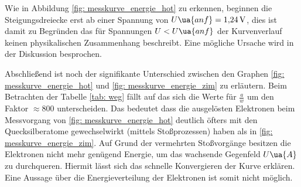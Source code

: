 Wie in Abbildung \ref{fig: messkurve_energie_hot} zu erkennen, beginnen die Steigungsdreiecke erst ab
einer Spannung von $U\ua{anf}=\SI{1.24}{\volt}$, dies ist damit zu Begründen das für Spannungen $U<U\ua{anf}$ %
der Kurvenverlauf keinen physikalischen Zusammenhang beschreibt. Eine mögliche Ursache wird
in der Diskussion besprochen.

Abschließend ist noch der signifikante Unterschied zwischen den Graphen \ref{fig: messkurve_energie_hot} und \ref{fig: messkurve_energie_zim}
zu erläutern. Beim Betrachten der Tabelle \ref{tab: weg} fällt auf das sich die Werte für $\frac{a}{w}$ um den Faktor $\approx 800$ unterscheiden. %
Das bedeutet dass die ausgelösten Elektronen beim Messvorgang von \ref{fig: messkurve_energie_hot} deutlich öfters mit den %
Quecksilberatome gewechselwirkt (mittels Stoßprozessen) haben als in \ref{fig: messkurve_energie_zim}. Auf Grund der vermehrten Stoßvorgänge besitzen die Elektronen nicht mehr genügend %
Energie, um das wachsende Gegenfeld $U\ua{A}$ zu durchqueren. Hiermit lässt sich das schnelle Konvergieren der Kurve erklären.
Eine Aussage über die Energieverteilung der Elektronen ist somit nicht möglich.
\FloatBarrier
